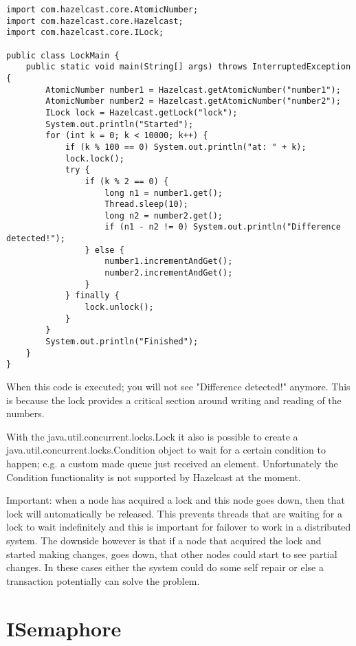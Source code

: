 \begin{verbatim}
import com.hazelcast.core.AtomicNumber;
import com.hazelcast.core.Hazelcast;
import com.hazelcast.core.ILock;

public class LockMain {
    public static void main(String[] args) throws InterruptedException {
        AtomicNumber number1 = Hazelcast.getAtomicNumber("number1");
        AtomicNumber number2 = Hazelcast.getAtomicNumber("number2");
        ILock lock = Hazelcast.getLock("lock");
        System.out.println("Started");
        for (int k = 0; k < 10000; k++) {
            if (k % 100 == 0) System.out.println("at: " + k);
            lock.lock();
            try {
                if (k % 2 == 0) {
                    long n1 = number1.get();
                    Thread.sleep(10);
                    long n2 = number2.get();
                    if (n1 - n2 != 0) System.out.println("Difference detected!");
                } else {
                    number1.incrementAndGet();
                    number2.incrementAndGet();
                }
            } finally {
                lock.unlock();
            }
        }
        System.out.println("Finished");
    }
}
\end{verbatim}

When this code is executed; you will not see "Difference detected!" anymore. This is because
the lock provides a critical section around writing and reading of the numbers. 

With the java.util.concurrent.locks.Lock it also is possible to create a java.util.concurrent.locks.Condition
object to wait for a certain condition to happen; e.g. a custom made queue just received an element. Unfortunately
the Condition functionality is not supported by Hazelcast at the moment.

Important: when a node has acquired a lock and this node goes down, then that lock will
automatically be released. This prevents threads that are waiting for a lock to wait 
indefinitely and this is important for failover to work in a distributed system. The downside
however is that if a node that acquired the lock and started making changes, goes down,
that other nodes could start to see partial changes. In these cases either the system
could do some self repair or else a transaction potentially can solve the problem.

\section{ISemaphore}

